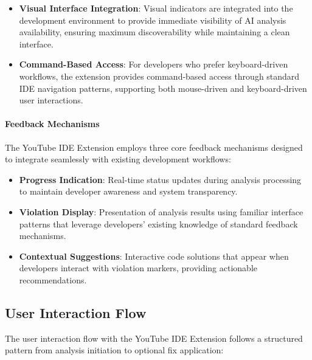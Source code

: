 \begin{spacing}{1.2}
\begin{itemize}
    \item \textbf{Visual Interface Integration}: Visual indicators are integrated into the development environment to provide immediate visibility of AI analysis availability, ensuring maximum discoverability while maintaining a clean interface.
    
    \item \textbf{Command-Based Access}: For developers who prefer keyboard-driven workflows, the extension provides command-based access through standard IDE navigation patterns, supporting both mouse-driven and keyboard-driven user interactions.
\end{itemize}

\paragraph{Feedback Mechanisms}
The YouTube IDE Extension employs three core feedback mechanisms designed to integrate seamlessly with existing development workflows:

\begin{itemize}
    \item \textbf{Progress Indication}: Real-time status updates during analysis processing to maintain developer awareness and system transparency.
    
    \item \textbf{Violation Display}: Presentation of analysis results using familiar interface patterns that leverage developers' existing knowledge of standard feedback mechanisms.
    
    \item \textbf{Contextual Suggestions}: Interactive code solutions that appear when developers interact with violation markers, providing actionable recommendations.
\end{itemize}


\subsection{User Interaction Flow}
The user interaction flow with the YouTube IDE Extension follows a structured pattern from analysis initiation to optional fix application:


\end{spacing}
